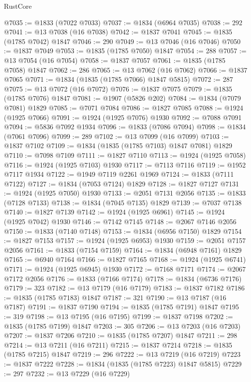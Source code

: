 \begin{lexlean}{RustCore}
\begin{coremodule}
@7035 := @1833 (@7022 @7033)
@7037 := @1834 (@6964 @7035)
@7038 := 292
@7041 := @13 @7038 (@16 @7038)
@7042 := @1837 @7041
@7045 := @1835 (@1785 @7042) @1847
@7046 := 290
@7049 := @13 @7046 (@16 @7046)
@7050 := @1837 @7049
@7053 := @1835 (@1785 @7050) @1847
@7054 := 288
@7057 := @13 @7054 (@16 @7054)
@7058 := @1837 @7057
@7061 := @1835 (@1785 @7058) @1847
@7062 := 286
@7065 := @13 @7062 (@16 @7062)
@7066 := @1837 @7065
@7071 := @1834 (@1835 (@1785 @7066) @1847 @5815)
@7072 := 287
@7075 := @13 @7072 (@16 @7072)
@7076 := @1837 @7075
@7079 := @1835 (@1785 @7076) @1847
@7081 := @1907 (@5826 @202)
@7084 := @1834 (@7079 @7081) @1829
@7085 := @7071 @7084
@7086 := @1827 @7085
@7088 := @1924 (@1925 @7066)
@7091 := @1924 (@1925 @7076) @1930
@7092 := @7088 @7091
@7094 := @5836 @7092 @1934
@7096 := @1833 (@7086 @7094)
@7098 := @1834 (@7061 @7096)
@7099 := 289
@7102 := @13 @7099 (@16 @7099)
@7103 := @1837 @7102
@7109 := @1834 (@1835 (@1785 @7103) @1847 @7081) @1829
@7110 := @7098 @7109
@7111 := @1827 @7110
@7113 := @1924 (@1925 @7058)
@7116 := @1924 (@1925 @7103) @1930
@7117 := @7113 @7116
@7119 := @1952 @7117 @1934
@7122 := @1949 @7119 @2261 @1969
@7124 := @1833 (@7111 @7122)
@7127 := @1834 (@7053 @7124) @1829
@7128 := @1827 @7127
@7131 := @1924 (@1925 @7050) @1930
@7133 := @2051 @7131 @2056
@7135 := @1833 (@7128 @7133)
@7138 := @1834 (@7045 @7135) @1829
@7139 := @7037 @7138
@7140 := @1827 @7139
@7142 := @1924 (@1925 @6961)
@7145 := @1924 (@1925 @7042) @1930
@7146 := @7142 @7145
@7148 := @2067 @7146 @2056
@7150 := @1833 (@7140 @7148)
@7153 := @1834 (@6956 @7150) @1829
@7154 := @1827 @7153
@7157 := @1924 (@1925 @6953) @1930
@7159 := @2051 @7157 @2056
@7161 := @1833 (@7154 @7159)
@7164 := @1834 (@6948 @7161) @1829
@7165 := @6940 @7164
@7166 := @1827 @7165
@7168 := @1924 (@1925 @6741)
@7171 := @1924 (@1925 @6945) @1930
@7172 := @7168 @7171
@7174 := @2067 @7172 @2056
@7176 := @1833 (@7166 @7174)
@7178 := @1834 (@6736 @7176)
@7179 := 323
@7182 := @13 @7179 (@16 @7179)
@7183 := @1837 @7182
@7186 := @1835 (@1785 @7183) @1847
@7187 := 321
@7190 := @13 @7187 (@16 @7187)
@7191 := @1837 @7190
@7194 := @1835 (@1785 @7191) @1847
@7195 := 319
@7198 := @13 @7195 (@16 @7195)
@7199 := @1837 @7198
@7202 := @1835 (@1785 @7199) @1847
@7203 := 305
@7206 := @13 @7203 (@16 @7203)
@7207 := @1837 @7206
@7210 := @1835 (@1785 @7207) @1847
@7211 := 298
@7214 := @13 @7211 (@16 @7211)
@7215 := @1837 @7214
@7218 := @1835 (@1785 @7215) @1847
@7219 := 296
@7222 := @13 @7219 (@16 @7219)
@7223 := @1837 @7222
@7228 := @1834 (@1835 (@1785 @7223) @1847 @5815)
@7229 := 297
@7232 := @13 @7229 (@16 @7229)

\end{coremodule}
\end{lexlean}
